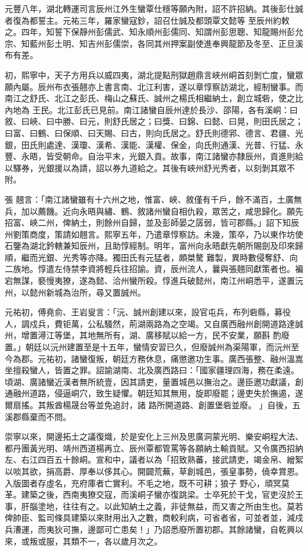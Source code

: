 \begin{pinyinscope}
 元豐八年，湖北轉運司言辰州江外生蠻覃仕穩等願內附，詔不許招納。其後彭仕誠者復為都誓主。元祐三年，羅家蠻寇鈔，詔召仕誠及都頭覃文懿等
 至辰州約敕之。四年，知誓下保靜州彭儒武、知永順州彭儒同、知謂州彭思聰、知龍賜州彭允宗、知藍州彭土明、知吉州彭儒崇，各同其州押案副使進奉興龍節及冬至、正旦溪布有差。



 初，熙寧中，天子方用兵以威四夷，湖北提點刑獄趙鼎言峽州峒首刻剝亡度，蠻眾願內屬。辰州布衣張翹亦上書言南、北江利害，遂以章惇察訪湖北，經制蠻事。而南江之舒氏、北江之彭氏、梅山之蘇氏、誠州之楊氏相繼納土，創立城砦，使之比內地為
 王民。北江彭氏已見前。南江諸蠻自辰州達於長沙、邵陽，各有溪峒：曰敘、曰峽、曰中勝、曰元，則舒氏居之；曰獎、曰錦、曰懿、曰晃，則田氏居之；曰富、曰鶴、曰保順、曰天賜、曰古，則向氏居之。舒氏則德郛、德言、君疆、光銀，田氏則處達、漢瓊、漢希、漢能、漢權、保金，向氏則通漢、光普、行猛、永豐、永晤，皆受朝命。自治平末，光銀入貢。故事，南江諸蠻亦隸辰州，貢進則給以驛券，光銀援以為請，詔以券九道給之。其後有峽州舒光秀者，以刻剝其眾不附。



 張
 翹言：「南江諸蠻雖有十六州之地，惟富、峽、敘僅有千戶，餘不滿百，土廣無兵，加以薦饑。近向永晤與繡、鶴、敘諸州蠻自相仇殺，眾苦之，咸思歸化。願先招富、峽二州，俾納土，則餘州自歸，並及彭師晏之孱弱，皆可郡縣。」詔下知辰州劉策商度，策請如翹言。熙寧五年，乃遣章惇察訪。未幾，策卒，乃以東作坊使石鑒為湖北鈐轄兼知辰州，且助惇經制。明年，富州向永晤獻先朝所賜劍及印來歸順，繼而光銀、光秀等亦降。獨田氏有元猛者，頗桀驁
 難製，異時數侵奪舒、向二族地。惇遣左侍禁李資將輕兵往招諭。資，辰州流人，曩與張翹同獻策者也。褊宕無謀，褻慢夷獠，遂為懿、洽州蠻所殺。惇進兵破懿州，南江州峒悉平，遂置沅州，以懿州新城為治所，尋又置誠州。



 元祐初，傅堯俞、王岩叟言：「沅、誠州創建以來，設官屯兵，布列砦縣，募役人，調戍兵，費钜萬，公私騷然，荊湖兩路為之空竭。又自廣西融州創開道路達誠州，增置潯江等堡，其地無所有，湖、廣移賦以給一方，民不安業，願斟
 酌廢置。」朝廷以沅州建置至是十五年，蠻情安習已久，但廢誠州為渠陽軍，而沅州至今為郡。元祐初，諸蠻復叛，朝廷方務休息，痛懲邀功生事。廣西張整、融州溫嵩坐擅殺蠻人，皆置之罪。詔諭湖南、北及廣西路曰：「國家疆理四海，務在柔遠。頃湖、廣諸蠻近漢者無所統壹，因其請吏，量置城邑以撫治之。邊臣邀功獻議，創通融州道路，侵逼峒穴，致生疑懼。朝廷知其無用，旋即廢罷；邊吏失於撫遏，遂爾扇搖。其叛酋楊晟台等並免追討，諸
 路所開道路、創置堡砦並廢。 」自後，五溪郡縣棄而不問。



 崇寧以來，開邊拓土之議復熾，於是安化上三州及思廣洞蒙光明、樂安峒程大法、都丹團黃光明、靖州西道楊再立、辰州覃都管罵等各願納土輸貢賦。又令廣西招納左、右江四百五十餘峒。宣和中，議者以為「招致熟蕃，接武請吏，竭金帛、繒絮以啖其欲，捐高爵、厚奉以侈其心。開闢荒蕪，草創城邑，張皇事勢，僥幸賞恩。入版圖者存虛名，充府庫者亡實利。不毛之地，既不可耕；狼子
 野心，頑冥莫革。建築之後，西南夷獠交寇，而溪峒子蠻亦復跳梁。士卒死於干戈，官吏沒於王事，肝腦塗地，往往有之。以此知納土之義，非徒無益，而又害之所由生也。莫若俾帥臣、監司條具建築以來財用出入之數，商較利病，可省者省，可並者並，減戍兵漕運，而夷狄可撫，邊鄙可亡患矣！」乃詔悉廢所置初郡。其餘諸蠻，自乾興以來，或叛或服，其類不一，各以歲月次之。




\end{pinyinscope}

